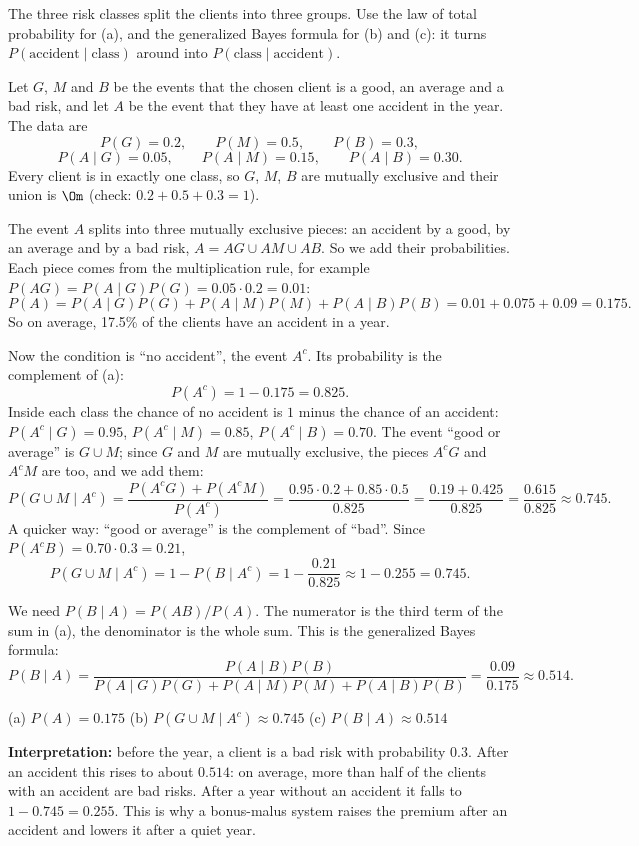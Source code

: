 \begin{solution}
	\idea The three risk classes split the clients into three groups. Use the
	law of total probability for (a), and the generalized Bayes formula for (b)
	and (c): it turns $P(\text{accident}\mid\text{class})$ around into
	$P(\text{class}\mid\text{accident})$.

	Let $G$, $M$ and $B$ be the events that the chosen client is a good, an
	average and a bad risk, and let $A$ be the event that they have at least one
	accident in the year. The data are
	\[ P(G)=0.2,\qquad P(M)=0.5,\qquad P(B)=0.3, \]
	\[ P(A\mid G)=0.05,\qquad P(A\mid M)=0.15,\qquad P(A\mid B)=0.30. \]
	Every client is in exactly one class, so $G$, $M$, $B$ are mutually
	exclusive and their union is $\Om$ (check: $0.2+0.5+0.3=1$).

	 The event $A$ splits into three mutually exclusive pieces: an
	accident by a good, by an average and by a bad risk, $A=AG\cup AM\cup AB$.
	So we add their probabilities. Each piece comes from the multiplication
	rule, for example $P(AG)=P(A\mid G)P(G)=0.05\cdot0.2=0.01$:
	\[ P(A)=P(A\mid G)P(G)+P(A\mid M)P(M)+P(A\mid B)P(B)
		=0.01+0.075+0.09=0.175. \]
	So on average, 17.5\% of the clients have an accident in a year.

	 Now the condition is ``no accident'', the event $A^c$. Its
	probability is the complement of (a):
	\[ P(A^c)=1-0.175=0.825. \]
	Inside each class the chance of no accident is $1$ minus the chance of an
	accident: $P(A^c\mid G)=0.95$, $P(A^c\mid M)=0.85$, $P(A^c\mid B)=0.70$.
	The event ``good or average'' is $G\cup M$; since $G$ and $M$ are mutually
	exclusive, the pieces $A^cG$ and $A^cM$ are too, and we add them:
	\[ P(G\cup M\mid A^c)=\frac{P(A^cG)+P(A^cM)}{P(A^c)}
		=\frac{0.95\cdot0.2+0.85\cdot0.5}{0.825}
		=\frac{0.19+0.425}{0.825}=\frac{0.615}{0.825}\approx0.745. \]
	A quicker way: ``good or average'' is the complement of ``bad''. Since
	$P(A^cB)=0.70\cdot0.3=0.21$,
	\[ P(G\cup M\mid A^c)=1-P(B\mid A^c)=1-\frac{0.21}{0.825}
		\approx1-0.255=0.745. \]

	 We need $P(B\mid A)=P(AB)/P(A)$. The numerator is the third term
	of the sum in (a), the denominator is the whole sum. This is the
	generalized Bayes formula:
	\[ P(B\mid A)=\frac{P(A\mid B)P(B)}
		{P(A\mid G)P(G)+P(A\mid M)P(M)+P(A\mid B)P(B)}
		=\frac{0.09}{0.175}\approx0.514. \]
	\begin{answer}
		(a) $P(A)=0.175$ \quad (b) $P(G\cup M\mid A^c)\approx0.745$ \quad
		(c) $P(B\mid A)\approx0.514$
	\end{answer}
	\begin{remark}
		\textbf{Interpretation:} before the year, a client is a bad risk with
		probability $0.3$. After an accident this rises to about $0.514$: on
		average, more than half of the clients with an accident are bad risks. After a year
		without an accident it falls to $1-0.745=0.255$. This is why a
		bonus-malus system raises the premium after an accident and lowers it
		after a quiet year.
	\end{remark}
\end{solution}
